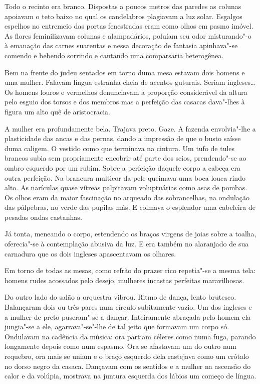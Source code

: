 Todo o recinto era branco. Dispostas a poucos metros das paredes as
colunas apoiavam o teto baixo no qual os candelabros plagiavam a luz
solar. Esgalgos espelhos no entremeio das portas fenestradas eram como
olhos em pasmo imóvel. As flores feminilizavam colunas e alampadários,
poluíam seu odor misturando"-o à emanação das carnes suarentas e nessa
decoração de fantasia apinhava"-se comendo e bebendo sorrindo e cantando
uma comparsaria heterogênea.

Bem na frente do judeu sentados em torno duma mesa estavam dois homens e
uma mulher. Falavam língua estranha cheia de acentos guturais. Seriam
ingleses\ldots{} Os homens louros e vermelhos denunciavam a proporção
considerável da altura pelo esguio dos torsos e dos membros mas a
perfeição das casacas dava"-lhes à figura um alto quê de aristocracia.

A mulher era profundamente bela. Trajava preto. Gaze. A fazenda
envolvia"-lhe a plasticidade das ancas e das pernas, dando a impressão de
que o busto saísse duma caligem. O vestido como que terminava na
cintura. Um tufo de tules brancos subia sem propriamente encobrir até
parte dos seios, prendendo"-se ao ombro esquerdo por um rubim. Sobre a
perfeição daquele corpo a cabeça era outra perfeição. Na brancura
multicor da pele queimava uma boca louca rindo alto. As narículas quase
vítreas palpitavam voluptuárias como asas de pombas. Os olhos eram da
maior fascinação no arqueado das sobrancelhas, na ondulação das
pálpebras, no verde das pupilas más. E colmava o esplendor uma cabeleira
de pesadas ondas castanhas.

Já tonta, meneando o corpo, estendendo os braços virgens de joias sobre
a toalha, oferecia"-se à contemplação abusiva da luz. E era também no
alaranjado de sua carnadura que os dois ingleses apascentavam os
olhares.

Em torno de todas as mesas, como refrão do prazer rico repetia"-se a
mesma tela: homens rudes acossados pelo desejo, mulheres incastas
perfeitas maravilhosas.

Do outro lado do salão a orquestra vibrou. Ritmo de dança, lento
brutesco. Balançaram dois ou três pares num círculo subitamente vazio.
Um dos ingleses e a mulher de preto puseram"-se a dançar. Inteiramente
abraçada pelo homem ela jungia"-se a ele, agarrava"-se"-lhe de tal jeito
que formavam um corpo só. Ondulavam na cadência da música: ora partiam
céleres como numa fuga, parando longamente depois como num espasmo. Ora
se afastavam um do outro num requebro, ora mais se uniam e o braço
esquerdo dela rastejava como um crótalo no dorso negro da casaca.
Dançavam com os sentidos e a mulher na ascensão do calor e da volúpia,
mostrava na juntura esquerda dos lábios um começo de língua.

